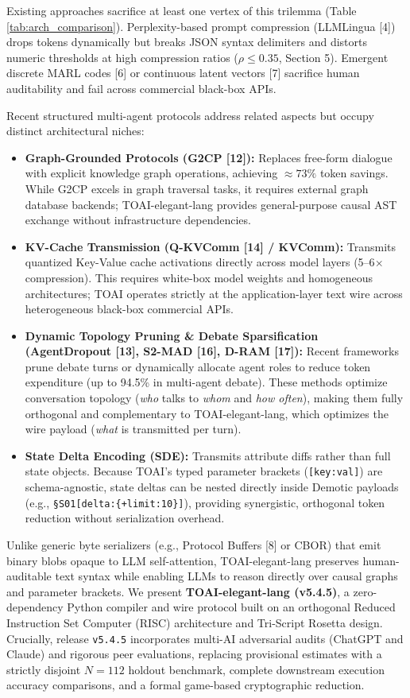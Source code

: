 \documentclass[9pt,a4paper]{extarticle}
\begin{document}
Existing approaches sacrifice at least one vertex of this trilemma (Table \ref{tab:arch_comparison}). Perplexity-based prompt compression (LLMLingua [4]) drops tokens dynamically but breaks JSON syntax delimiters and distorts numeric thresholds at high compression ratios ($\rho \le 0.35$, Section 5). Emergent discrete MARL codes [6] or continuous latent vectors [7] sacrifice human auditability and fail across commercial black-box APIs. 

Recent structured multi-agent protocols address related aspects but occupy distinct architectural niches:
\begin{itemize}[leftmargin=1.2em,itemsep=1pt,topsep=1pt]
  \item \textbf{Graph-Grounded Protocols (G2CP [12]):} Replaces free-form dialogue with explicit knowledge graph operations, achieving $\approx 73\%$ token savings. While G2CP excels in graph traversal tasks, it requires external graph database backends; TOAI-elegant-lang provides general-purpose causal AST exchange without infrastructure dependencies.
  \item \textbf{KV-Cache Transmission (Q-KVComm [14] / KVComm):} Transmits quantized Key-Value cache activations directly across model layers (5--6$\times$ compression). This requires white-box model weights and homogeneous architectures; TOAI operates strictly at the application-layer text wire across heterogeneous black-box commercial APIs.
  \item \textbf{Dynamic Topology Pruning \& Debate Sparsification (AgentDropout [13], S2-MAD [16], D-RAM [17]):} Recent frameworks prune debate turns or dynamically allocate agent roles to reduce token expenditure (up to 94.5\% in multi-agent debate). These methods optimize conversation topology (\emph{who} talks to \emph{whom} and \emph{how often}), making them fully orthogonal and complementary to TOAI-elegant-lang, which optimizes the wire payload (\emph{what} is transmitted per turn).
  \item \textbf{State Delta Encoding (SDE):} Transmits attribute diffs rather than full state objects. Because TOAI's typed parameter brackets (\texttt{[key:val]}) are schema-agnostic, state deltas can be nested directly inside Demotic payloads (e.g., \texttt{\S S01[delta:\{+limit:10\}]}), providing synergistic, orthogonal token reduction without serialization overhead.
\end{itemize}

Unlike generic byte serializers (e.g., Protocol Buffers [8] or CBOR) that emit binary blobs opaque to LLM self-attention, TOAI-elegant-lang preserves human-auditable text syntax while enabling LLMs to reason directly over causal graphs and parameter brackets. We present \textbf{TOAI-elegant-lang (v5.4.5)}, a zero-dependency Python compiler and wire protocol built on an orthogonal Reduced Instruction Set Computer (RISC) architecture and Tri-Script Rosetta design. Crucially, release \texttt{v5.4.5} incorporates multi-AI adversarial audits (ChatGPT and Claude) and rigorous peer evaluations, replacing provisional estimates with a strictly disjoint $N=112$ holdout benchmark, complete downstream execution accuracy comparisons, and a formal game-based cryptographic reduction.
\end{document}
